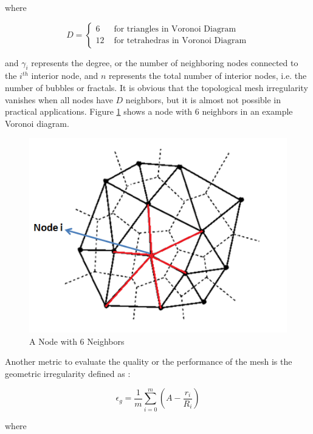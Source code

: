 where 

\begin{equation}
D = \left\{ \begin{array}{rl}
6                               &\mbox{ for triangles in Voronoi Diagram} \\
12                             &\mbox{ for tetrahedras in Voronoi Diagram}
\end{array} \right.
\end{equation}
	
and $\gamma _i$ represents the degree, or the number of neighboring nodes connected to the $i^{th}$ interior node, and $n$ represents the total number of interior nodes, i.e. the number of bubbles or fractals. It is obvious that the topological mesh irregularity vanishes when all nodes have $D$ neighbors, but it is almost not possible in practical applications. Figure \ref{6komusulunode} shows a node with 6 neighbors in an example Voronoi diagram.
	
\begin{figure}[H]
\caption{A Node with 6 Neighbors} \label{6komusulunode}
\centering
\includegraphics[scale = 0.70]{voronoi}
\end{figure}

Another metric to evaluate the quality or the performance of the mesh is the geometric irregularity defined as \cite{27}:

\begin{equation}
\epsilon _g = \frac{1}{m} \sum_{i = 0}^{m} (A-\frac{r_i}{R_i})
\end{equation}

where
 
